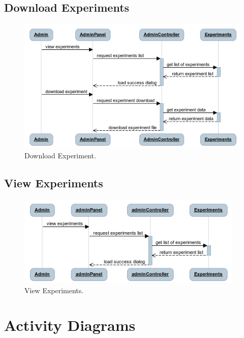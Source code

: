 \documentclass[a4paper,12pt,oneside]{report}
\begin{document}
\subsection{Download Experiments}
\begin{figure}[!hp]
  \begin{center}
   \includegraphics[width=11.6cm]{pics/download_experiments.png}
  \end{center}
\caption{Download Experiment.}
\end{figure}

\newpage

\vskip 1cm
\subsection{View Experiments}
\vskip 1cm
\begin{figure}[!hp]
  \begin{center}
   \includegraphics[width=10.8cm]{pics/view_experiments.png}
  \end{center}
\caption{View Experiments.}
\end{figure}


\newpage

\section{Activity Diagrams}
\end{document}

